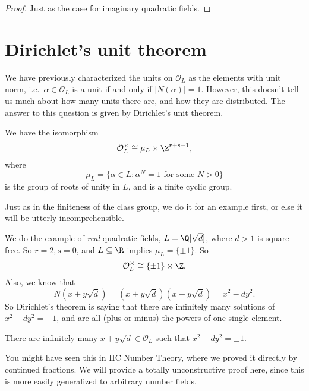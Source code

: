 \documentclass[a4paper]{article}
\begin{document}
\begin{proof}
  Just as the case for imaginary quadratic fields.
\end{proof}

\section{Dirichlet's unit theorem}
We have previously characterized the units on $\mathcal{O}_L$ as the elements with unit norm, i.e.\ $\alpha \in \mathcal{O}_L$ is a unit if and only if $|N(\alpha)| = 1$. However, this doesn't tell us much about how many units there are, and how they are distributed. The answer to this question is given by Dirichlet's unit theorem.

\begin{thm}
  We have the isomorphism
  \[
    \mathcal{O}_L^\times \cong \mu_L \times \Z^{r + s - 1},
  \]
  where
  \[
    \mu_L = \{\alpha \in L: \alpha^N = 1\text{ for some }N > 0\}
  \]
  is the group of roots of unity in $L$, and is a finite cyclic group.
\end{thm}

Just as in the finiteness of the class group, we do it for an example first, or else it will be utterly incomprehensible.

We do the example of \emph{real} quadratic fields, $L = \Q[\sqrt{d}]$, where $d > 1$ is square-free. So $r = 2, s = 0$, and $L \subseteq \R$ implies $\mu_L = \{\pm 1\}$. So
\[
  \mathcal{O}_L^\times \cong \{\pm 1\} \times \Z.
\]
Also, we know that
\[
  N(x + y\sqrt{d}) = (x + y\sqrt{d})(x - y\sqrt{d}) = x^2 - dy^2.
\]
So Dirichlet's theorem is saying that there are infinitely many solutions of $x^2 - dy^2 = \pm 1$, and are all (plus or minus) the powers of one single element.

\begin{thm}
  There are infinitely many $x + y\sqrt{d} \in \mathcal{O}_L$ such that $x^2 - dy^2 = \pm 1$.
\end{thm}
You might have seen this in IIC Number Theory, where we proved it directly by continued fractions. We will provide a totally unconstructive proof here, since this is more easily generalized to arbitrary number fields.
\end{document}
